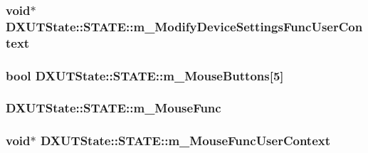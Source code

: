 \hypertarget{struct_d_x_u_t_state_1_1_s_t_a_t_e_aa82feb03854adbaa82dcad585968f0af}{
\subsubsection[{m\_\-ModifyDeviceSettingsFuncUserContext}]{\setlength{\rightskip}{0pt plus 5cm}void$\ast$ {\bf DXUTState::STATE::m\_\-ModifyDeviceSettingsFuncUserContext}}}
\label{struct_d_x_u_t_state_1_1_s_t_a_t_e_aa82feb03854adbaa82dcad585968f0af}
\hypertarget{struct_d_x_u_t_state_1_1_s_t_a_t_e_a6e494c7c6eb55ee3ad56a53325b679d4}{
\subsubsection[{m\_\-MouseButtons}]{\setlength{\rightskip}{0pt plus 5cm}bool {\bf DXUTState::STATE::m\_\-MouseButtons}\mbox{[}5\mbox{]}}}
\label{struct_d_x_u_t_state_1_1_s_t_a_t_e_a6e494c7c6eb55ee3ad56a53325b679d4}
\hypertarget{struct_d_x_u_t_state_1_1_s_t_a_t_e_a92ce70e6a56d51f8f281cb3d91ed150a}{
\subsubsection[{m\_\-MouseFunc}]{ {\bf DXUTState::STATE::m\_\-MouseFunc}}}
\label{struct_d_x_u_t_state_1_1_s_t_a_t_e_a92ce70e6a56d51f8f281cb3d91ed150a}
\hypertarget{struct_d_x_u_t_state_1_1_s_t_a_t_e_aaccf619ab6ad3da01bdecc0fd6c51e79}{
\subsubsection[{m\_\-MouseFuncUserContext}]{\setlength{\rightskip}{0pt plus 5cm}void$\ast$ {\bf DXUTState::STATE::m\_\-MouseFuncUserContext}}}
\label{struct_d_x_u_t_state_1_1_s_t_a_t_e_aaccf619ab6ad3da01bdecc0fd6c51e79}
